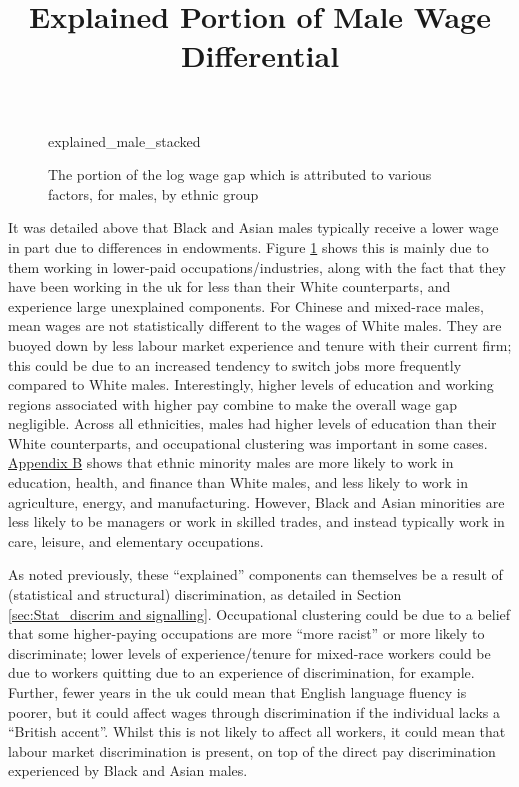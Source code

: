 \documentclass[class=article, crop=false]{standalone}
\begin{document}
\begin{figure}[h]
\centering
    \title{Explained Portion of Male Wage Differential}
    {explained_male_stacked}
    \caption{The portion of the log wage gap which is attributed to various factors, for males, by ethnic group}
    \label{fig:explained_male_stacked}
\end{figure}

It was detailed above that Black and Asian males typically receive a lower wage in part due to differences in endowments. Figure \ref{fig:explained_male_stacked} shows this is mainly due to them working in lower-paid occupations/industries, along with the fact that they have been working in the \acrshort{uk} for less than their White counterparts, and experience large unexplained components. For Chinese and mixed-race males, mean wages are not statistically different to the wages of White males. They are buoyed down by less labour market experience and tenure with their current firm; this could be due to an increased tendency to switch jobs more frequently compared to White males. Interestingly, higher levels of education and working regions associated with higher pay combine to make the overall wage gap negligible. Across all ethnicities, males had higher levels of education than their White counterparts, and occupational clustering was important in some cases. \hyperref[sec:appendixB]{Appendix B} shows that ethnic minority males are more likely to work in education, health, and finance than White males, and less likely to work in agriculture, energy, and manufacturing. However, Black and Asian minorities are less likely to be managers or work in skilled trades, and instead typically work in care, leisure, and elementary occupations.

As noted previously, these \enquote{explained} components can themselves be a result of (statistical and structural) discrimination, as detailed in Section \ref{sec:Stat_discrim and signalling}. Occupational clustering could be due to a belief that some higher-paying occupations are more \enquote{more racist} or more likely to discriminate; lower levels of experience/tenure for mixed-race workers could be due to workers quitting due to an experience of discrimination, for example. Further, fewer years in the \acrshort{uk} could mean that English language fluency is poorer, but it could affect wages through discrimination if the individual lacks a \enquote{British accent}. Whilst this is not likely to affect all workers, it could mean that labour market discrimination is present, on top of the direct pay discrimination experienced by Black and Asian males.
\end{document}
